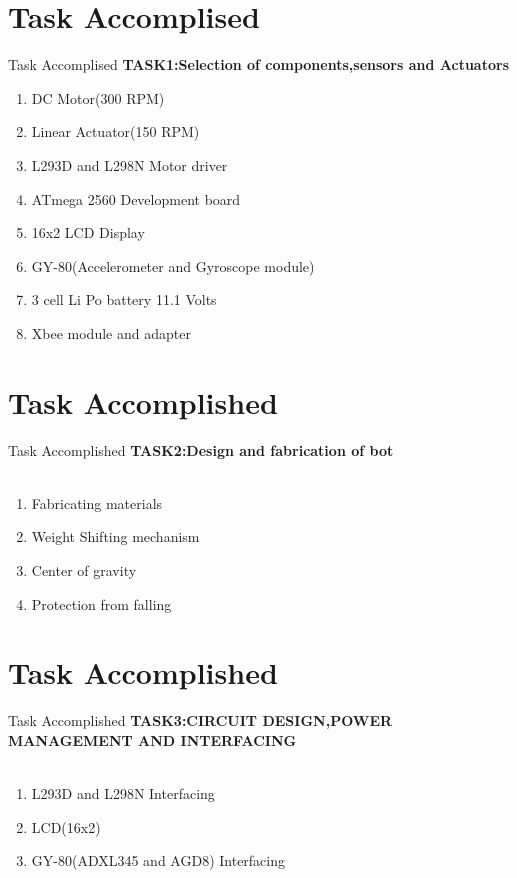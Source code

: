 \documentclass[10pt, a4paper]{beamer}
\begin{document}
\section{Task Accomplised}
\begin{frame}{Task Accomplised}
	\textbf{TASK1:Selection of components,sensors and Actuators} \\
    \begin{enumerate}
     \item DC Motor(300 RPM)
     \item Linear Actuator(150 RPM)
     \item L293D and L298N Motor driver
     \item ATmega 2560 Development board
     \item 16x2 LCD Display
     \item GY-80(Accelerometer and Gyroscope module)
     \item 3 cell Li Po battery 11.1 Volts
     \item Xbee module and adapter
    \end{enumerate}
\end{frame}

\section{Task Accomplished}
\begin{frame}{Task Accomplished}
	\textbf{TASK2:Design and fabrication of bot}\\ \\
	\begin{enumerate}
		\item Fabricating materials
		\item Weight Shifting mechanism
		\item Center of gravity
		\item Protection from falling  
	\end{enumerate}
\end{frame}


\section{Task Accomplished}
\begin{frame}{Task Accomplished}
	\textbf{TASK3:CIRCUIT DESIGN,POWER MANAGEMENT AND INTERFACING}\\ \\
	\begin{enumerate}
		\item L293D and L298N Interfacing
		\item LCD(16x2) 
		\item GY-80(ADXL345 and AGD8) Interfacing  
	\end{enumerate}
\end{frame}
\end{document}
